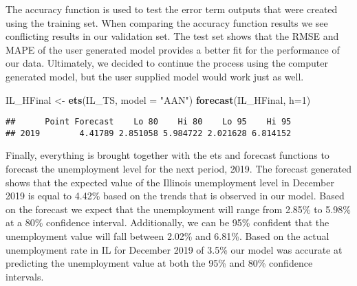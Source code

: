 \documentclass[
]{article}
\newenvironment{Shaded}{\begin{snugshade}}{\end{snugshade}}
\newcommand{\CommentTok}[1]{\textcolor[rgb]{0.56,0.35,0.01}{\textit{#1}}}
\newcommand{\DataTypeTok}[1]{\textcolor[rgb]{0.13,0.29,0.53}{#1}}
\newcommand{\DecValTok}[1]{\textcolor[rgb]{0.00,0.00,0.81}{#1}}
\newcommand{\KeywordTok}[1]{\textcolor[rgb]{0.13,0.29,0.53}{\textbf{#1}}}
\newcommand{\NormalTok}[1]{#1}
\newcommand{\OperatorTok}[1]{\textcolor[rgb]{0.81,0.36,0.00}{\textbf{#1}}}
\newcommand{\StringTok}[1]{\textcolor[rgb]{0.31,0.60,0.02}{#1}}
\begin{document}
The accuracy function is used to test the error term outputs that were
created using the training set. When comparing the accuracy function
results we see conflicting results in our validation set. The test set
shows that the RMSE and MAPE of the user generated model provides a
better fit for the performance of our data. Ultimately, we decided to
continue the process using the computer generated model, but the user
supplied model would work just as well.

\begin{Shaded}
\begin{Highlighting}[]
\NormalTok{IL_HFinal <-}\StringTok{ }\KeywordTok{ets}\NormalTok{(IL_TS, }\DataTypeTok{model =} \StringTok{"AAN"}\NormalTok{)}
\KeywordTok{forecast}\NormalTok{(IL_HFinal, }\DataTypeTok{h=}\DecValTok{1}\NormalTok{)}
\end{Highlighting}
\end{Shaded}

\begin{verbatim}
##      Point Forecast    Lo 80    Hi 80    Lo 95    Hi 95
## 2019        4.41789 2.851058 5.984722 2.021628 6.814152
\end{verbatim}

Finally, everything is brought together with the ets and forecast
functions to forecast the unemployment level for the next period, 2019.
The forecast generated shows that the expected value of the Illinois
unemployment level in December 2019 is equal to 4.42\% based on the
trends that is observed in our model. Based on the forecast we expect
that the unemployment will range from 2.85\% to 5.98\% at a 80\%
confidence interval. Additionally, we can be 95\% confident that the
unemployment value will fall between 2.02\% and 6.81\%. Based on the
actual unemployment rate in IL for December 2019 of 3.5\% our model was
accurate at predicting the unemployment value at both the 95\% and 80\%
confidence intervals.

\begin{Shaded}
\end{Shaded}
\end{document}
